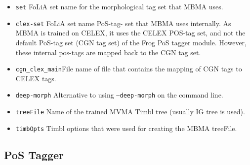 \documentclass{book}
\begin{document}
\begin{itemize}
\item {\tt set} FoLiA set name for the morphological tag set that MBMA uses.
\item {\tt clex-set} FoLiA set name PoS-tag- set that MBMA uses internally. As MBMA is trained on CELEX, it uses the CELEX POS-tag set, and not the default PoS-tag set (CGN tag set) of the Frog PoS tagger module. However, these internal pos-tags are mapped back to the CGN tag set.



\item {\tt cgn\_clex\_main}File name of file that contains the mapping of CGN tags to
CELEX tags.







\item {\tt deep-morph} Alternative to using {\tt --deep-morph} on the command line.
\item {\tt treeFile}  Name of the trained MVMA Timbl tree (usually IG tree is used).
\item {\tt timbOpts}  Timbl options that were used for creating the MBMA treeFile.
\end{itemize}

\subsection{PoS Tagger}
\label{sec-bg-pos}
\end{document}
